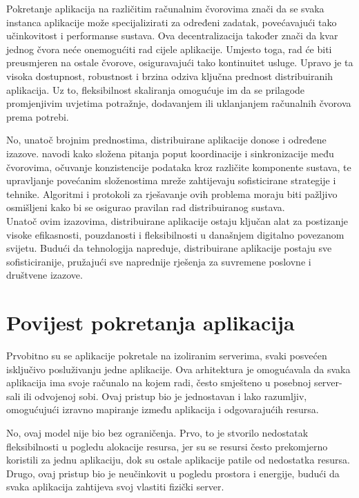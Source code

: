\documentclass[times, utf8, diplomski]{fer}
\begin{document}
Pokretanje aplikacija na različitim računalnim čvorovima znači da se svaka instanca aplikacije može specijalizirati za određeni zadatak, povećavajući tako učinkovitost i performanse sustava. Ova decentralizacija također znači da kvar jednog čvora neće onemogućiti rad cijele aplikacije. Umjesto toga, rad će biti preusmjeren na ostale čvorove, osiguravajući tako kontinuitet usluge. Upravo je ta visoka dostupnost, robustnost i brzina odziva ključna prednost distribuiranih aplikacija. Uz to, fleksibilnost skaliranja omogućuje im da se prilagode promjenjivim uvjetima potražnje, dodavanjem ili uklanjanjem računalnih čvorova prema potrebi.

No, unatoč brojnim prednostima, distribuirane aplikacije donose i određene izazove. \citet{zarko_raspodijeljeni_2013} navodi kako složena pitanja poput koordinacije i sinkronizacije među čvorovima, očuvanje konzistencije podataka kroz različite komponente sustava, te upravljanje povećanim složenostima mreže zahtijevaju sofisticirane strategije i tehnike. Algoritmi i protokoli za rješavanje ovih problema moraju biti pažljivo osmišljeni kako bi se osigurao pravilan rad distribuiranog sustava. \\

Unatoč ovim izazovima, distribuirane aplikacije ostaju ključan alat za postizanje visoke efikasnosti, pouzdanosti i fleksibilnosti u današnjem digitalno povezanom svijetu. Budući da tehnologija napreduje, distribuirane aplikacije postaju sve sofisticiranije, pružajući sve naprednije rješenja za suvremene poslovne i društvene izazove.

\section{Povijest pokretanja aplikacija}

Prvobitno su se aplikacije pokretale na izoliranim serverima, svaki posvećen isključivo posluživanju jedne aplikacije. Ova arhitektura je omogućavala da svaka aplikacija ima svoje računalo na kojem radi, često smješteno u posebnoj server-sali ili odvojenoj sobi. Ovaj pristup bio je jednostavan i lako razumljiv, omogućujući izravno mapiranje između aplikacija i odgovarajućih resursa. 

No, ovaj model nije bio bez ograničenja. Prvo, to je stvorilo nedostatak fleksibilnosti u pogledu alokacije resursa, jer su se resursi često prekomjerno koristili za jednu aplikaciju, dok su ostale aplikacije patile od nedostatka resursa. Drugo, ovaj pristup bio je neučinkovit u pogledu prostora i energije, budući da svaka aplikacija zahtijeva svoj vlastiti fizički server.
\end{document}
